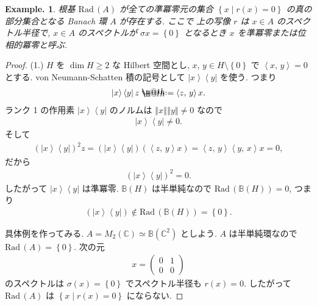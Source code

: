 \documentclass[openany, a4paper, oneside]{jsbook}
\makeatletter
\newcommand*{\defeq}{\mathrel{\rlap{%
\raisebox{0.3ex}{$\m@th\cdot$}}%
\raisebox{-0.3ex}{$\m@th\cdot$}}%
=}
\newcommand{\Rad}{\mathrm{Rad}\,}
\theoremstyle{break}
\theoremstyle{breakdefn}
\newtheorem{ex}[thm]{Example.}
\newcommand{\norm}[1]{\left\Vert#1\right\Vert}
\newcommand{\rbk}[1]{\left (#1\right)}
\newcommand{\cbk}[1]{\left\{#1\right\}}
\newcommand{\bkt}[2]{\left\langle#1,\,#2\right\rangle}
\newcommand{\relmiddle}[1]{\mathrel{}\middle#1\mathrel{}}
\newcommand{\set}[2]{\left\{#1 \relmiddle| #2\right\}}
\newcommand{\bra}[1]{\left\langle #1 \right|}
\newcommand{\ket}[1]{\left| #1 \right\rangle}
\newcommand{\bbB}{\mathbb{B}}
\newcommand{\bbC}{\mathbb{C}}
\makeatother
\begin{document}
\begin{ex}
根基 $\Rad (A)$ が全ての準冪零元の集合 $\set{x}{r(x) = 0}$ の真の部分集合となる Banach 環 $A$ が存在する.
ここで 上の写像 $r$ は $x \in A$ のスペクトル半径で,
$x \in A$ のスペクトルが $\sigma x = \cbk{0}$ となるとき $x$ を準冪零または位相的冪零と呼ぶ.
\end{ex}
\begin{proof}
(1.) $H$ を $\dim H \geq 2$ な Hilbert 空間とし,
$x$, $y \in H \setminus \cbk{0}$ で $\bkt{x}{y} = 0$ とする.
von Neumann-Schatten 積の記号として $\ket{x} \bra{y}$ を使う.
つまり
\begin{align}
 \ket{x} \bra{y} z
 \defeq
 \bkt{z}{y} x.
\end{align}
ランク 1 の作用素 $\ket{x} \bra{y}$ のノルムは $\norm{x} \norm{y} \neq 0$ なので
\begin{align}
 \ket{x} \bra{y}
 \neq 0.
\end{align}
そして
\begin{align}
 \rbk{\ket{x} \bra{y}}^2 z
 =
 \rbk{\ket{x} \bra{y}} \rbk{\bkt{z}{y} x}
 =
 \bkt{z}{y} \bkt{y}{x} x
 = 0,
\end{align}
だから
\begin{align}
 \rbk{\ket{x} \bra{y}}^2
 = 0.
\end{align}
したがって $\ket{x} \bra{y}$ は準冪零.
$\bbB (H)$ は半単純なので $\Rad \rbk{\bbB (H)} = 0$, つまり
\begin{align}
 \rbk{\ket{x} \bra{y}} \notin \Rad \rbk{\bbB (H)}
 =
 \cbk{0}.
\end{align}

具体例を作ってみる.
$A = M_2 (\bbC) \simeq \bbB (\bbC^2)$ としよう.
$A$ は半単純環なので $\Rad (A) = \cbk{0}$.
次の元
\begin{align}
 x
 =
 \begin{pmatrix}
  0 & 1 \\
  0 & 0
 \end{pmatrix}
\end{align}
のスペクトルは $\sigma (x) = \cbk{0}$ でスペクトル半径も $r(x) = 0$.
したがって $\Rad (A)$ は $\set{x}{r(x) = 0}$ にならない.
\end{proof}
\end{document}
